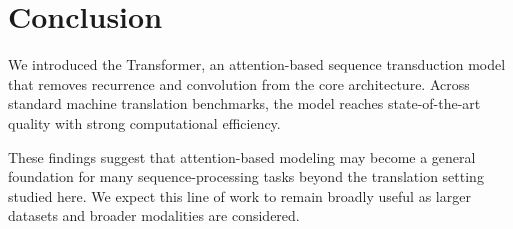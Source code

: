 \section{Conclusion}

We introduced the Transformer, an attention-based sequence transduction model that removes recurrence and convolution from the core architecture. Across standard machine translation benchmarks, the model reaches state-of-the-art quality with strong computational efficiency.

These findings suggest that attention-based modeling may become a general foundation for many sequence-processing tasks beyond the translation setting studied here. We expect this line of work to remain broadly useful as larger datasets and broader modalities are considered.

